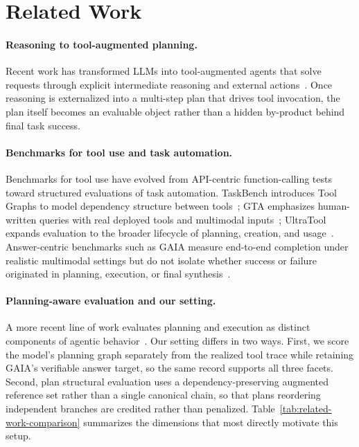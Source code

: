 \documentclass{article}
\begin{document}
\section{Related Work}
\label{sec:related-work}

\paragraph{Reasoning to tool-augmented planning.} Recent work has transformed LLMs into tool-augmented agents that solve requests through explicit intermediate reasoning and external actions~\cite{CoT,yao2022react,yao2024tree}. Once reasoning is externalized into a multi-step plan that drives tool invocation, the plan itself becomes an evaluable object rather than a hidden by-product behind final task success.

\paragraph{Benchmarks for tool use and task automation.} Benchmarks for tool use have evolved from API-centric function-calling tests~\cite{patil2023gorilla,qin2023toolllm} toward structured evaluations of task automation. TaskBench introduces Tool Graphs to model dependency structure between tools~\cite{shen2024taskbench}; GTA emphasizes human-written queries with real deployed tools and multimodal inputs~\cite{wang2024gta}; UltraTool expands evaluation to the broader lifecycle of planning, creation, and usage~\cite{huang2024ultratool}. Answer-centric benchmarks such as GAIA measure end-to-end completion under realistic multimodal settings but do not isolate whether success or failure originated in planning, execution, or final synthesis~\cite{mialon2023gaia}.

\paragraph{Planning-aware evaluation and our setting.} A more recent line of work evaluates planning and execution as distinct components of agentic behavior~\cite{gabriel2024advancing,ahn2026orchestrationbench}. Our setting differs in two ways. First, we score the model's planning graph separately from the realized tool trace while retaining GAIA's verifiable answer target, so the same record supports all three facets. Second, plan structural evaluation uses a dependency-preserving augmented reference set rather than a single canonical chain, so that plans reordering independent branches are credited rather than penalized. 
Table~\ref{tab:related-work-comparison} summarizes the dimensions that most directly motivate this setup.
\end{document}
